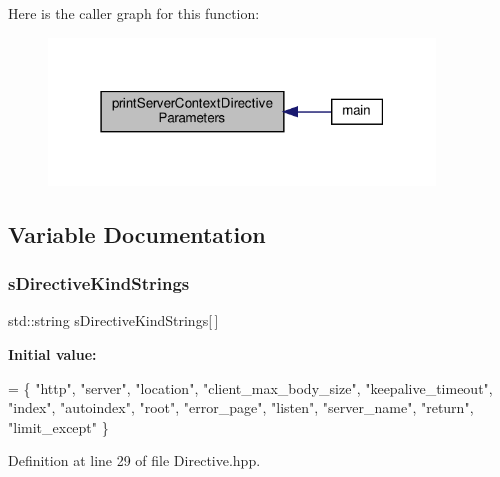 Here is the caller graph for this function\+:
\nopagebreak
\begin{figure}[H]
\begin{center}
\leavevmode
\includegraphics[width=291pt]{namespaceft_aba285440a3c3f0158982e0376d6a24f6_icgraph}
\end{center}
\end{figure}


\subsection{Variable Documentation}
\mbox{\label{namespaceft_a2896a632198d516af93e4aea2d125f59}} 
\subsubsection{\texorpdfstring{s\+Directive\+Kind\+Strings}{sDirectiveKindStrings}}
{\footnotesize\ttfamily std\+::string s\+Directive\+Kind\+Strings\mbox{[}$\,$\mbox{]}\hspace{0.3cm}{\ttfamily [static]}}

{\bfseries Initial value\+:}
\begin{DoxyCode}
= \{
        \textcolor{stringliteral}{"http"},
        \textcolor{stringliteral}{"server"},
        \textcolor{stringliteral}{"location"},
        \textcolor{stringliteral}{"client\_max\_body\_size"},
        \textcolor{stringliteral}{"keepalive\_timeout"},
        \textcolor{stringliteral}{"index"},
        \textcolor{stringliteral}{"autoindex"},
        \textcolor{stringliteral}{"root"},
        \textcolor{stringliteral}{"error\_page"},
        \textcolor{stringliteral}{"listen"},
        \textcolor{stringliteral}{"server\_name"},
        \textcolor{stringliteral}{"return"},
        \textcolor{stringliteral}{"limit\_except"}
    \}
\end{DoxyCode}


Definition at line 29 of file Directive.\+hpp.

